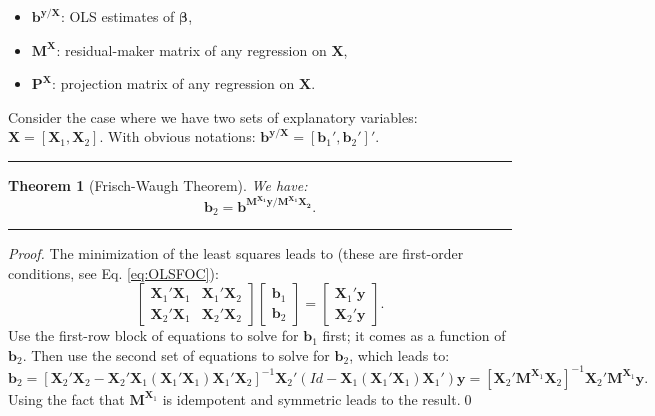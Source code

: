 \documentclass[
]{book}
\providecommand{\tightlist}{%
  \setlength{\itemsep}{0pt}\setlength{\parskip}{0pt}}
\newtheorem{theorem}{Theorem}[chapter]
\theoremstyle{definition}
\theoremstyle{definition}
\theoremstyle{definition}
\theoremstyle{definition}
\theoremstyle{remark}
\begin{document}
\begin{itemize}
\tightlist
\item
  \(\mathbf{b}^{\mathbf{y}/\mathbf{X}}\): OLS estimates of \(\boldsymbol\beta\),
\item
  \(\mathbf{M}^{\mathbf{X}}\): residual-maker matrix of any regression on \(\mathbf{X}\),
\item
  \(\mathbf{P}^{\mathbf{X}}\): projection matrix of any regression on \(\mathbf{X}\).
\end{itemize}

Consider the case where we have two sets of explanatory variables: \(\mathbf{X} = [\mathbf{X}_1,\mathbf{X}_2]\). With obvious notations: \(\mathbf{b}^{\mathbf{y}/\mathbf{X}}=[\mathbf{b}_1',\mathbf{b}_2']'\).

\begin{center}\rule{0.5\linewidth}{0.5pt}\end{center}

\begin{theorem}[Frisch-Waugh Theorem]
\protect\hypertarget{thm:FW}{}\label{thm:FW}We have:
\[
\mathbf{b}_2 = \mathbf{b}^{\mathbf{M^{\mathbf{X}_1}y}/\mathbf{M^{\mathbf{X}_1}\mathbf{X}_2}}.
\]
\end{theorem}

\begin{center}\rule{0.5\linewidth}{0.5pt}\end{center}

\begin{proof}
The minimization of the least squares leads to (these are first-order conditions, see Eq. \eqref{eq:OLSFOC}):
\[
\left[ \begin{array}{cc} \mathbf{X}_1'\mathbf{X}_1 & \mathbf{X}_1'\mathbf{X}_2 \\ \mathbf{X}_2'\mathbf{X}_1 & \mathbf{X}_2'\mathbf{X}_2\end{array}\right]
\left[ \begin{array}{c} \mathbf{b}_1 \\ \mathbf{b}_2\end{array}\right] =
\left[ \begin{array}{c} \mathbf{X}_1' \mathbf{y} \\ \mathbf{X}_2' \mathbf{y} \end{array}\right].
\]
Use the first-row block of equations to solve for \(\mathbf{b}_1\) first; it comes as a function of \(\mathbf{b}_2\). Then use the second set of equations to solve for \(\mathbf{b}_2\), which leads to:
\[
\mathbf{b}_2 = [\mathbf{X}_2'\mathbf{X}_2 - \mathbf{X}_2'\mathbf{X}_1(\mathbf{X}_1'\mathbf{X}_1)\mathbf{X}_1'\mathbf{X}_2]^{-1}\mathbf{X}_2'(Id - \mathbf{X}_1(\mathbf{X}_1'\mathbf{X}_1)\mathbf{X}_1')\mathbf{y}=[\mathbf{X}_2' \mathbf{M}^{\mathbf{X}_1}\mathbf{X}_2]^{-1}\mathbf{X}_2'\mathbf{M}^{\mathbf{X}_1}\mathbf{y}.
\]
Using the fact that \(\mathbf{M}^{\mathbf{X}_1}\) is idempotent and symmetric leads to the result.\qed
\end{proof}
\end{document}

